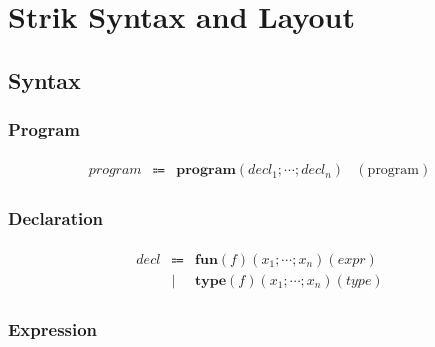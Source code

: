 \section{Strik Syntax and Layout}

\subsection{Syntax}

\subsubsection{Program}

\begin{align*}
  \begin{array}{rclr}
    \mathit{program}
    & \Coloneq & \mathbf{program}(\mathit{decl}_1; \cdots; \mathit{decl}_n) &(\text{program})
  \end{array}
\end{align*}

\subsubsection{Declaration}

\begin{align*}
  \begin{array}{rclr}
    \mathit{decl}
    & \Coloneq & \mathbf{fun}(f)(x_1; \cdots; x_n)(\mathit{expr}) \\
    & \mid & \mathbf{type}(f)(x_1; \cdots; x_n)(\mathit{type})
  \end{array}
\end{align*}

\subsubsection{Expression}

